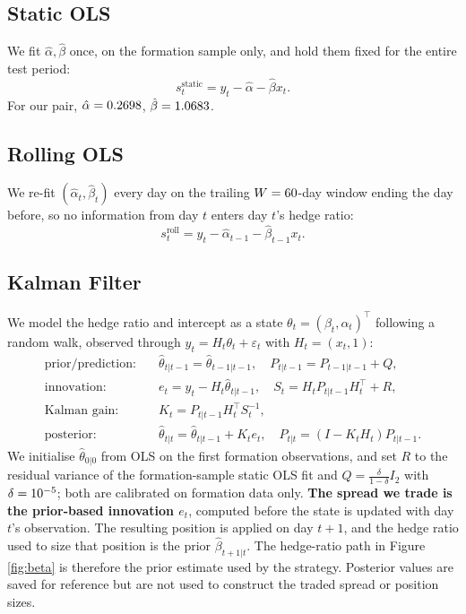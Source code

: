 \documentclass[11pt,a4paper]{article}
\begin{document}
\subsection{Static OLS}\label{sec:static}
We fit $\hat\alpha,\hat\beta$ once, on the formation sample only, and hold them fixed for the entire test period:
\begin{equation}
s_t^{\text{static}} = y_t - \hat\alpha - \hat\beta x_t.
\end{equation}
For our pair, $\hat\alpha=0.2698{}$, $\hat\beta=1.0683{}$.

\subsection{Rolling OLS}\label{sec:rolling}
We re-fit $(\hat\alpha_t,\hat\beta_t)$ every day on the trailing $W=60{}$-day window ending the day before, so no information from day $t$ enters day $t$'s hedge ratio:
\begin{equation}
s_t^{\text{roll}} = y_t - \hat\alpha_{t-1} - \hat\beta_{t-1} x_t.
\end{equation}

\subsection{Kalman Filter}\label{sec:kalman}
We model the hedge ratio and intercept as a state $\theta_t = (\beta_t,\alpha_t)^\top$ following a random walk, observed through $y_t = H_t\theta_t+\varepsilon_t$ with $H_t=(x_t,1)$:
\begin{align}
\text{prior/prediction:}\quad & \hat\theta_{t|t-1}=\hat\theta_{t-1|t-1}, \quad P_{t|t-1}=P_{t-1|t-1}+Q,\\
\text{innovation:}\quad & e_t = y_t - H_t\hat\theta_{t|t-1}, \quad S_t = H_tP_{t|t-1}H_t^\top+R,\\
\text{Kalman gain:}\quad & K_t = P_{t|t-1}H_t^\top S_t^{-1},\\
\text{posterior:}\quad & \hat\theta_{t|t}=\hat\theta_{t|t-1}+K_te_t, \quad P_{t|t}=(I-K_tH_t)P_{t|t-1}.
\end{align}
We initialise $\hat\theta_{0|0}$ from OLS on the first \KalmanBurnin{} formation observations, and set $R$ to the residual variance of the formation-sample static OLS fit and $Q=\frac{\delta}{1-\delta}I_2$ with $\delta=10^{-5}{}$; both are calibrated on formation data only. \textbf{The spread we trade is the prior-based innovation $e_t$}, computed before the state is updated with day $t$'s observation. The resulting position is applied on day $t+1$, and the hedge ratio used to size that position is the prior $\hat\beta_{t+1|t}$. The hedge-ratio path in Figure \ref{fig:beta} is therefore the prior estimate used by the strategy. Posterior values are saved for reference but are not used to construct the traded spread or position sizes.
\end{document}
